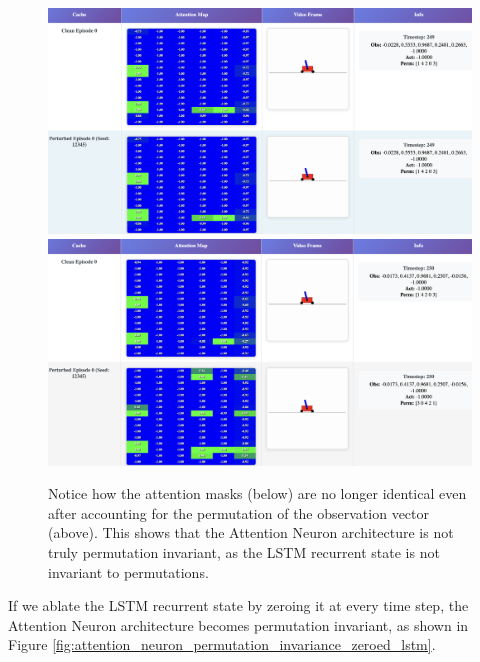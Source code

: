 \documentclass{article}
\begin{document}
\begin{figure}[h!]
    \centering
    \includegraphics[width=\textwidth]{images/was_identical.png}
    \includegraphics[width=\textwidth]{images/not_permutation_invariant.png}
    \caption{Notice how the attention masks (below) are no longer identical even after accounting for the permutation of the observation vector (above). This shows that the Attention Neuron architecture is not truly permutation invariant, as the LSTM recurrent state is not invariant to permutations.}
    \label{fig:attention_neuron_permutation_invariance}
\end{figure}

If we ablate the LSTM recurrent state by zeroing it at every time step,
the Attention Neuron architecture becomes permutation invariant, as shown in Figure \ref{fig:attention_neuron_permutation_invariance_zeroed_lstm}.
\end{document}
